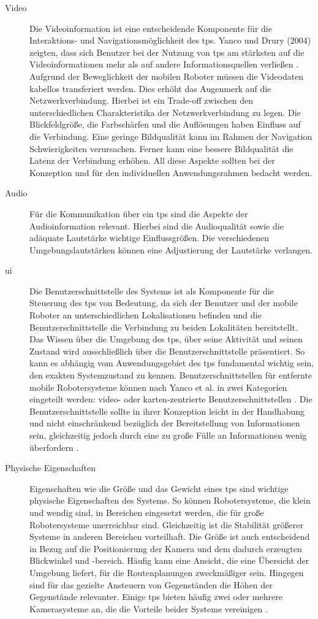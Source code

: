 \begin{description}
\item[Video] Die Videoinformation ist eine entscheidende Komponente für die Interaktions- und Navigationsmöglichkeit des \acs{tps}. Yanco und Drury (2004) zeigten, dass sich Benutzer bei der Nutzung von \acs{tps} am stärksten auf die Videoinformationen mehr als auf andere Informationsquellen verließen \cite{Yanco2004}. Aufgrund der Beweglichkeit der mobilen Roboter müssen die Videodaten kabellos transferiert werden. Dies erhöht das Augenmerk auf die Netzwerkverbindung. Hierbei ist ein Trade-off zwischen den unterschiedlichen Charakteristika der Netzwerkverbindung zu legen. Die Blickfeldgröße, die Farbschärfen und die Auflösungen haben Einfluss auf die Verbindung. Eine geringe Bildqualität kann im Rahmen der Navigation Schwierigkeiten verursachen. Ferner kann eine bessere Bildqualität die Latenz der Verbindung erhöhen. All diese Aspekte sollten bei der Konzeption und für den individuellen Anwendungsrahmen bedacht werden.
\item[Audio] Für die Kommunikation über ein \acs{tps} sind die Aspekte der Audioinformation relevant. Hierbei sind die Audioqualität sowie die adäquate Lautstärke wichtige Einflussgrößen. Die verschiedenen Umgebungslautstärken können eine Adjustierung der Lautstärke verlangen.
\item[\acf{ui}] Die Benutzerschnittstelle des Systems ist als Komponente für die Steuerung des \acs{tps} von Bedeutung, da sich der Benutzer und der mobile Roboter an unterschiedlichen Lokalisationen befinden und die Benutzerschnittstelle die Verbindung zu beiden Lokalitäten bereitstellt. Das Wissen über die Umgebung des \acs{tps}, über seine Aktivität und seinen Zustand wird ausschließlich über die Benutzerschnittstelle präsentiert. So kann es abhängig vom Anwendungsgebiet des \acs{tps} fundamental wichtig sein, den exakten Systemzustand zu kennen. Benutzerschnittstellen für entfernte mobile Robotersysteme können nach Yanco et al. in zwei Kategorien eingeteilt werden: video- oder karten-zentrierte Benutzerschnittstellen \cite{Yanco2007,Keyes2010}.
Die Benutzerschnittstelle sollte in ihrer Konzeption leicht in der Handhabung und nicht einschränkend bezüglich der Bereitstellung von Informationen sein, gleichzeitig jedoch durch eine zu große Fülle an Informationen wenig überfordern \cite{Desai2011}. 
\item[Physische Eigenschaften] Eigenschaften wie die Größe und das Gewicht eines \acs{tps} sind wichtige physische Eigenschaften des Systems. So können Robotersysteme, die klein und wendig sind, in Bereichen eingesetzt werden, die für große Robotersysteme unerreichbar sind. Gleichzeitig ist die Stabilität größerer Systeme in anderen Bereichen vorteilhaft. Die Größe ist auch entscheidend in Bezug auf die Positionierung der Kamera und dem dadurch erzeugten Blickwinkel und -bereich. Häufig kann eine Ansicht, die eine Übersicht der Umgebung liefert, für die Routenplanungen zweckmäßiger sein. Hingegen sind für das gezielte Ansteuern von Gegenständen die Höhen der Gegenstände relevanter. Einige \acs{tps} bieten häufig zwei oder mehrere Kamerasysteme an, die die Vorteile beider Systeme vereinigen \cite{Kristoffersson2013}. 

\end{description}
